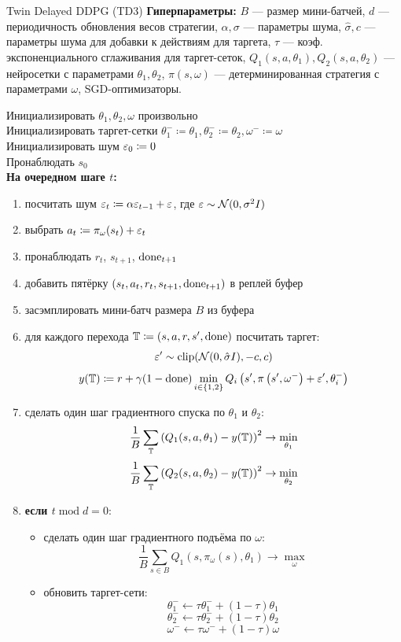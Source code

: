 \begin{algorithm}[label = TD3]{Twin Delayed DDPG (TD3)}
\textbf{Гиперпараметры:} $B$ --- размер мини-батчей, $d$ --- периодичность обновления весов стратегии, $\alpha, \sigma$ --- параметры шума, $\hat{\sigma}, c$ --- параметры шума для добавки к действиям для таргета, $\tau$ --- коэф. экспоненциального сглаживания для таргет-сеток, $Q_1(s, a, \theta_1), Q_2(s, a, \theta_2)$ --- нейросетки с параметрами $\theta_1, \theta_2$, $\pi(s, \omega)$ --- детерминированная стратегия с параметрами $\omega$, SGD-оптимизаторы.

\vspace{0.3cm}
Инициализировать $\theta_1, \theta_2, \omega$ произвольно \\
Инициализировать таргет-сетки $\theta_1^- \coloneqq \theta_1, \theta_2^- \coloneqq \theta_2, \omega^- \coloneqq \omega$ \\
Инициализировать шум $\varepsilon_0 \coloneqq 0$ \\
Пронаблюдать $s_0$ \\
\textbf{На очередном шаге $t$:}
\begin{enumerate}
    \item посчитать шум $\varepsilon_{t} \coloneqq \alpha \varepsilon_{t-1} + \varepsilon$, где $\varepsilon \sim \mathcal{N}(0, \sigma^2 I)$
    \item выбрать $a_t \coloneqq \pi_\omega(s_t) + \varepsilon_{t}$
    \item пронаблюдать $r_t$,  $s_{t+1}$, $\mathrm{done}_{t+1}$
    \item добавить пятёрку $(s_t, a_t, r_t, s_{t+1}, \mathrm{done}_{t+1})$ в реплей буфер
    \item засэмплировать мини-батч размера $B$ из буфера
    \item для каждого перехода $\mathbb{T} \coloneqq (s, a, r, s', \mathrm{done})$ посчитать таргет:
    $$\varepsilon' \sim \mathrm{clip}(\mathcal{N}(0, \hat{\sigma}I), -c, c)$$
    $$y(\mathbb{T} ) \coloneqq r + \gamma (1 - \mathrm{done}) \min_{i \in \{1, 2\}}Q_i\left( s', \pi \left( s', \omega^{-}\right) + \varepsilon', \theta_i^{-} \right)$$
    \item сделать один шаг градиентного спуска по $\theta_1$ и $\theta_2$:
    $$\frac{1}{B}\sum_{\mathbb{T}} \left( Q_1(s, a, \theta_1) - y(\mathbb{T} ) \right) ^2 \to \min_{\theta_1}$$
    $$\frac{1}{B}\sum_{\mathbb{T}} \left( Q_2(s, a, \theta_2) - y(\mathbb{T} ) \right) ^2 \to \min_{\theta_2}$$
    \item \textbf{если $t \operatorname{mod} d = 0$}:
    \begin{itemize}
        \item сделать один шаг градиентного подъёма по $\omega$:
        $$\frac{1}{B}\sum_{s \in B} Q_1(s, \pi_\omega(s), \theta_1) \to \max_{\omega}$$
        \item обновить таргет-сети:
        $$\theta^{-}_1 \gets \tau \theta^{-}_1 + (1 - \tau) \theta_1$$
        $$\theta^{-}_2 \gets \tau \theta^{-}_2 + (1 - \tau) \theta_2$$
        $$\omega^{-} \gets \tau \omega^{-}   + (1 - \tau) \omega$$
    \end{itemize}
\end{enumerate}
\end{algorithm}
